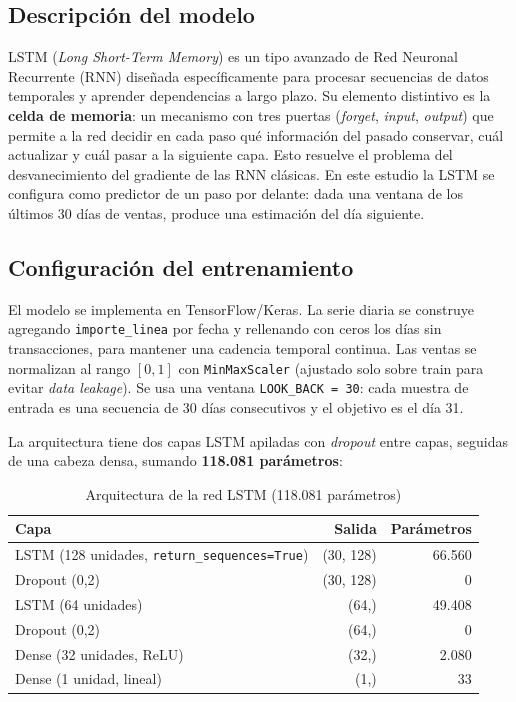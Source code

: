 \documentclass[11pt,a4paper]{article}
\begin{document}
\subsection{Descripción del modelo}

LSTM (\textit{Long Short-Term Memory}) es un tipo avanzado de Red Neuronal Recurrente (RNN) diseñada específicamente para procesar secuencias de datos temporales y aprender dependencias a largo plazo. Su elemento distintivo es la \textbf{celda de memoria}: un mecanismo con tres puertas (\textit{forget}, \textit{input}, \textit{output}) que permite a la red decidir en cada paso qué información del pasado conservar, cuál actualizar y cuál pasar a la siguiente capa. Esto resuelve el problema del desvanecimiento del gradiente de las RNN clásicas. En este estudio la LSTM se configura como predictor de un paso por delante: dada una ventana de los últimos 30 días de ventas, produce una estimación del día siguiente.

\subsection{Configuración del entrenamiento}

El modelo se implementa en TensorFlow/Keras. La serie diaria se construye agregando \texttt{importe\_linea} por fecha y rellenando con ceros los días sin transacciones, para mantener una cadencia temporal continua. Las ventas se normalizan al rango $[0,1]$ con \texttt{MinMaxScaler} (ajustado solo sobre train para evitar \textit{data leakage}). Se usa una ventana \texttt{LOOK\_BACK = 30}: cada muestra de entrada es una secuencia de 30 días consecutivos y el objetivo es el día 31.

La arquitectura tiene dos capas LSTM apiladas con \textit{dropout} entre capas, seguidas de una cabeza densa, sumando \textbf{118.081 parámetros}:

\begin{table}[h]
\centering
\caption{Arquitectura de la red LSTM (118.081 parámetros)}
\begin{tabular}{lrr}
\toprule
\textbf{Capa} & \textbf{Salida} & \textbf{Parámetros} \\
\midrule
LSTM (128 unidades, \texttt{return\_sequences=True}) & (30, 128) & 66.560 \\
Dropout (0,2) & (30, 128) & 0 \\
LSTM (64 unidades) & (64,) & 49.408 \\
Dropout (0,2) & (64,) & 0 \\
Dense (32 unidades, ReLU) & (32,) & 2.080 \\
Dense (1 unidad, lineal) & (1,) & 33 \\
\bottomrule
\end{tabular}
\end{table}
\end{document}
